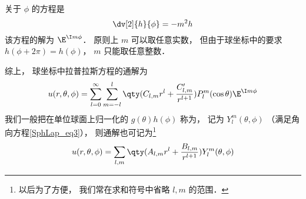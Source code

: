 关于 $\phi$ 的方程是
\begin{equation}
\dv[2]{h}{\phi} = -m^2 h
\end{equation}
该方程的解为 $\E^{\I m\phi}$． 原则上 $m$ 可以取任意实数， 但由于球坐标中的要求 $h(\phi + 2\pi) = h(\phi)$， $m$ 只能取任意整数．

综上， 球坐标中拉普拉斯方程的通解为
\begin{equation}
u(r, \theta, \phi) = \sum_{l = 0}^\infty \sum_{m = -l}^l \qty(C_{l,m} r^l + \frac{C'_{l,m}}{r^{l+1}})P_l^m(\cos\theta)\E^{\I m\phi}
\end{equation}
我们一般把在单位球面上归一化的 $g(\theta)h(\phi)$ 称为， 记为 $Y_l^m(\theta,\phi)$ （满足角向方程\autoref{SphLap_eq3}）， 则通解也可记为\footnote{以后为了方便， 我们常在求和符号中省略 $l, m$ 的范围．}
\begin{equation}
u(r, \theta, \phi) = \sum_{l,m} \qty(A_{l,m} r^l + \frac{B_{l,m}}{r^{l+1}}) Y_l^m (\theta, \phi)
\end{equation}
